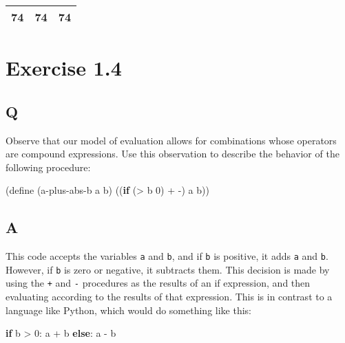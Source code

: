 \documentclass[
]{article}
\newenvironment{Shaded}{}{}
\newcommand{\ControlFlowTok}[1]{\textcolor[rgb]{0.00,0.44,0.13}{\textbf{#1}}}
\newcommand{\DecValTok}[1]{\textcolor[rgb]{0.25,0.63,0.44}{#1}}
\newcommand{\ExtensionTok}[1]{#1}
\newcommand{\FunctionTok}[1]{\textcolor[rgb]{0.02,0.16,0.49}{#1}}
\newcommand{\KeywordTok}[1]{\textcolor[rgb]{0.00,0.44,0.13}{\textbf{#1}}}
\newcommand{\NormalTok}[1]{#1}
\newcommand{\OperatorTok}[1]{\textcolor[rgb]{0.40,0.40,0.40}{#1}}
\begin{document}
\begin{longtable}[]{@{}lll@{}}
\toprule
\endhead
74 & 74 & 74 \\
\bottomrule
\end{longtable}

\hypertarget{exercise-1.4}{%
\section{Exercise 1.4}\label{exercise-1.4}}

\hypertarget{q-3}{%
\subsection{Q}\label{q-3}}

Observe that our model of evaluation allows for combinations whose
operators are compound expressions. Use this observation to describe the
behavior of the following procedure:

\hypertarget{a-plus-abs-b}{%
\label{a-plus-abs-b}}%
\begin{Shaded}
\begin{Highlighting}[]
\NormalTok{(}\ExtensionTok{define}\FunctionTok{ }\NormalTok{(a{-}plus{-}abs{-}b a b)}
\NormalTok{  ((}\KeywordTok{if}\NormalTok{ (}\OperatorTok{\textgreater{}}\NormalTok{ b }\DecValTok{0}\NormalTok{) }\OperatorTok{+} \OperatorTok{{-}}\NormalTok{) a b))}
\end{Highlighting}
\end{Shaded}

\hypertarget{a-3}{%
\subsection{A}\label{a-3}}

This code accepts the variables \texttt{a} and \texttt{b}, and if
\texttt{b} is positive, it adds \texttt{a} and \texttt{b}. However, if
\texttt{b} is zero or negative, it subtracts them. This decision is made
by using the \texttt{+} and \texttt{-} procedures as the results of an
if expression, and then evaluating according to the results of that
expression. This is in contrast to a language like Python, which would
do something like this:

\begin{Shaded}
\begin{Highlighting}[]
\ControlFlowTok{if}\NormalTok{ b }\OperatorTok{\textgreater{}} \DecValTok{0}\NormalTok{: a }\OperatorTok{+}\NormalTok{ b}
\ControlFlowTok{else}\NormalTok{: a }\OperatorTok{{-}}\NormalTok{ b}
\end{Highlighting}
\end{Shaded}
\end{document}
